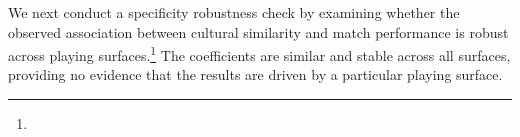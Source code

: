 \documentclass[10pt]{article}
\begin{document}


We next conduct a specificity robustness check by examining whether the observed association between cultural similarity and match performance is robust across playing surfaces.\footnote{} The coefficients are similar and stable across all surfaces, providing no evidence that the results are driven by a particular playing surface. 
\end{document}
